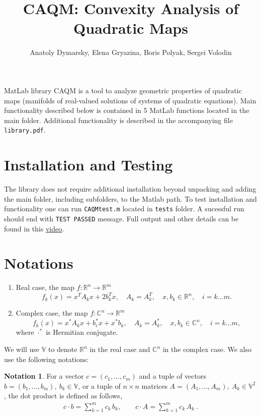 \documentclass[a4paper]{article}
\title{CAQM: Convexity Analysis of Quadratic Maps}
\date{}
\author{Anatoly Dymarsky, Elena Gryazina, Boris Polyak, Sergei Volodin}
\theoremstyle{definition}
\newtheorem{definition}{Notation}[]
\begin{document}
\maketitle
MatLab library CAQM is a tool to analyze geometric properties of quadratic maps (manifolds of real-valued solutions of systems of quadratic equations).
Main functionality described below is contained in 5 MatLab functions located in the main folder.
Additional functionality is described in the accompanying file {\tt library.pdf}.

\section*{Installation and Testing}
The library does not require additional installation beyond unpacking and adding the main folder, including subfolders, to the Matlab path.
To test installation and functionality one can run {\tt CAQMtest.m} located in {\tt tests} folder.
A sucessful run should end with {\tt TEST PASSED} message.
Full output and other details can be found in this \href{https://youtu.be/Ikh_GDHnu-4}{video}.

\section*{Notations}
\begin{enumerate}
\item Real case, the map $f\colon \mathbb{R}^n\to\mathbb{R}^m$
\begin{equation}
f_k(x)=x^TA_k x+2b_k^Tx ,\quad A_k=A_k^T ,\quad x, b_k\in \mathbb{R}^n ,\quad i=k\dots m . \label{real}
\end{equation}
\item Complex case, the map $f\colon \mathbb{C}^n\to\mathbb{R}^m$
\begin{equation}
f_k(x)=x^*A_k x+b_i^*x+x^*b_k ,\quad A_k=A_k^* ,\quad x, b_k\in \mathbb{C}^n ,\quad i=k\dots m ,\label{complex}
\end{equation}
where $\cdot^*$ is Hermitian conjugate.
\end{enumerate}

We will use $\mathbb{V}$ to denote $\mathbb{R}^n$ in the real case and $\mathbb{C}^n$ in the  complex case.
We also use the following notations:\\

\theoremstyle{definition}
\begin{definition}
For a vector $c=(c_1,...,c_m)$ and a tuple of vectors $b=(b_1,...,b_m), \ b_k \in \mathbb{V}$, or a tuple of $n\times n$ matrices $A=(A_1,...,A_m), \  A_k\in \mathbb{V}^2$, the dot product is defined as follows,
\begin{eqnarray}
c\cdot b=\sum\limits_{k=1}^m c_k\, b_k ,\qquad
c\cdot A=\sum\limits_{k=1}^m c_k\, A_k\ . \nonumber
\end{eqnarray}
\end{definition}
\end{document}
